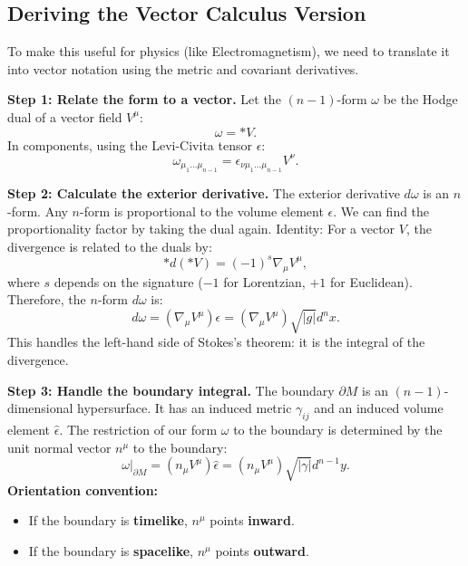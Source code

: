 \documentclass[11pt, a4paper]{report}
\begin{document}
\subsection*{Deriving the Vector Calculus Version}
To make this useful for physics (like Electromagnetism), we need to translate it into vector notation using the metric and covariant derivatives.

\textbf{Step 1: Relate the form to a vector.}
Let the $(n-1)$-form $\omega$ be the Hodge dual of a vector field $V^\mu$:
\begin{equation}
\omega = *V.
\end{equation}
In components, using the Levi-Civita tensor $\epsilon$:
\begin{equation}
\omega_{\mu_1 \dots \mu_{n-1}} = \epsilon_{\nu \mu_1 \dots \mu_{n-1}} V^\nu.
\end{equation}

\textbf{Step 2: Calculate the exterior derivative.}
The exterior derivative $d\omega$ is an $n$-form. Any $n$-form is proportional to the volume element $\epsilon$. We can find the proportionality factor by taking the dual again.
Identity: For a vector $V$, the divergence is related to the duals by:
\begin{equation}
*d(*V) = (-1)^s \nabla_\mu V^\mu,
\end{equation}
where $s$ depends on the signature ($-1$ for Lorentzian, $+1$ for Euclidean).
Therefore, the $n$-form $d\omega$ is:
\begin{equation}
d\omega = (\nabla_\mu V^\mu) \epsilon = (\nabla_\mu V^\mu) \sqrt{|g|} d^n x.
\end{equation}
This handles the left-hand side of Stokes's theorem: it is the integral of the divergence.

\textbf{Step 3: Handle the boundary integral.}
The boundary $\partial M$ is an $(n-1)$-dimensional hypersurface. It has an induced metric $\gamma_{ij}$ and an induced volume element $\hat{\epsilon}$.
The restriction of our form $\omega$ to the boundary is determined by the unit normal vector $n^\mu$ to the boundary:
\begin{equation}
\omega|_{\partial M} = (n_\mu V^\mu) \hat{\epsilon} = (n_\mu V^\mu) \sqrt{|\gamma|} d^{n-1} y.
\end{equation}
\textbf{Orientation convention:}
\begin{itemize}
    \item If the boundary is \textbf{timelike}, $n^\mu$ points \textbf{inward}.
    \item If the boundary is \textbf{spacelike}, $n^\mu$ points \textbf{outward}.
\end{itemize}
\end{document}

